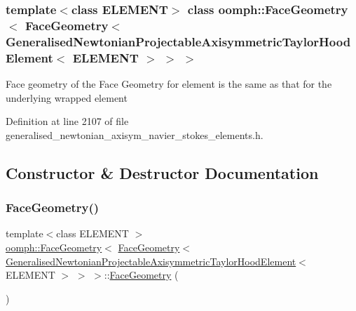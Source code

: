 \subsubsection*{template$<$class E\+L\+E\+M\+E\+NT$>$\newline
class oomph\+::\+Face\+Geometry$<$ Face\+Geometry$<$ Generalised\+Newtonian\+Projectable\+Axisymmetric\+Taylor\+Hood\+Element$<$ E\+L\+E\+M\+E\+N\+T $>$ $>$ $>$}

Face geometry of the Face Geometry for element is the same as that for the underlying wrapped element 

Definition at line 2107 of file generalised\+\_\+newtonian\+\_\+axisym\+\_\+navier\+\_\+stokes\+\_\+elements.\+h.



\subsection{Constructor \& Destructor Documentation}
\mbox{\label{classoomph_1_1FaceGeometry_3_01FaceGeometry_3_01GeneralisedNewtonianProjectableAxisymmetricTaylodd4d51505b2586f1026bb874336afc4e_a249cbe8110ab9e5a30ca154d299d15ec}} 
\subsubsection{\texorpdfstring{Face\+Geometry()}{FaceGeometry()}}
{\footnotesize\ttfamily template$<$class E\+L\+E\+M\+E\+NT $>$ \\
\hyperlink{classoomph_1_1FaceGeometry}{oomph\+::\+Face\+Geometry}$<$ \hyperlink{classoomph_1_1FaceGeometry}{Face\+Geometry}$<$ \hyperlink{classoomph_1_1GeneralisedNewtonianProjectableAxisymmetricTaylorHoodElement}{Generalised\+Newtonian\+Projectable\+Axisymmetric\+Taylor\+Hood\+Element}$<$ E\+L\+E\+M\+E\+NT $>$ $>$ $>$\+::\hyperlink{classoomph_1_1FaceGeometry}{Face\+Geometry} (\begin{DoxyParamCaption}{ }\end{DoxyParamCaption})\hspace{0.3cm}{\ttfamily [inline]}}



